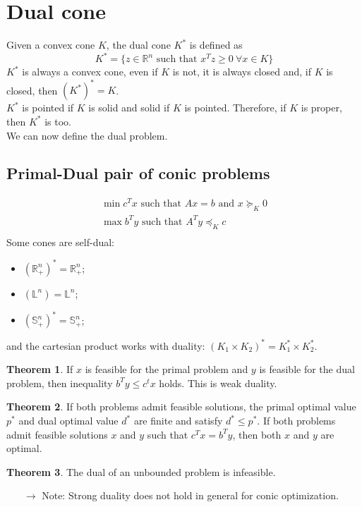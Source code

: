 \documentclass[12pt, openany]{report}
\newcommand{\R}{\mathbb{R}}
\theoremstyle{definition}
\newtheorem{thm}{Theorem}[chapter]
\begin{document}
\section{Dual cone}
Given a convex cone $K$, the dual cone $K^*$ is defined as
\begin{equation}
    K^* = \{z\in \R^n\text{ such that } x^Tz \ge 0 \: \forall x\in K\}
\end{equation}
$K^*$ is always a convex cone, even if $K$ is not, it is always closed and, if $K$ is closed, then $(K^*)^* = K$. \\
$K^*$ is pointed if $K$ is solid and solid if $K$ is pointed. Therefore, if $K$ is proper, then $K^*$ is too. \\
We can now define the dual problem. 
\subsection{Primal-Dual pair of conic problems}
\begin{equation}
    \begin{aligned}
        \min c^Tx \text{ such that } Ax=b\text{ and }x\succeq_K0\\
        \max b^Ty \text{ such that } A^Ty\preceq_K c\\
    \end{aligned}
\end{equation}
Some cones are self-dual:
\begin{itemize}
    \item $(\R_+^n)^* = \R_+^n$;
    \item $(\mathbb{L}^n) = \mathbb{L}^n$;
    \item $(\mathbb{S}_+^n)^* = \mathbb{S}_+^n$;
\end{itemize}
and the cartesian product works with duality: $(K_1\times K_2)^* = K_1^* \times K_2^*$.
\begin{thm}
    If $x$ is feasible for the primal problem and $y$ is feasible for the dual problem, then inequality $b^Ty \le c^tx$ holds. This is weak duality. 
\end{thm}
\begin{thm}
    If both problems admit feasible solutions, the primal optimal value $p^*$ and dual optimal value $d^*$ are finite and satisfy $d^*\le p^*$. If both problems admit feasible solutions $x$ and $y$ such that $c^Tx=b^Ty$, then both $x$ and $y$ are optimal.
\end{thm}
\begin{thm}
    The dual of an unbounded problem is infeasible.
\end{thm}
\begin{itemize}
    \item [$\rightarrow$] Note: Strong duality does not hold in general for conic optimization.
\end{itemize}
\end{document}
